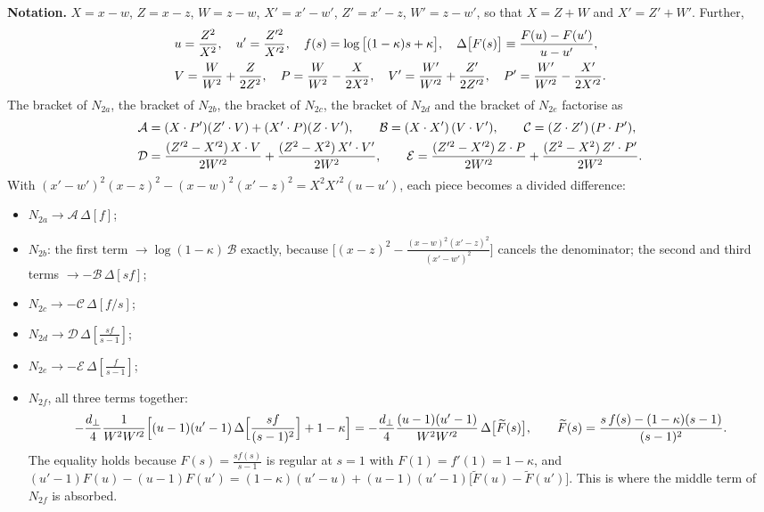 \documentclass[9pt]{article}
\numberwithin{equation}{section}
\begin{document}
{\noindent\textbf{Notation.} $X=x-w$, $Z=x-z$, $W=z-w$, $X'=x'-w'$, $Z'=x'-z$, $W'=z-w'$, so that $X=Z+W$ and $X'=Z'+W'$. Further,
\begin{align}
&u=\frac{Z^{2}}{X^{2}},\quad u'=\frac{Z'^{2}}{X'^{2}},\quad f(s)=\log\big[(1-\kappa)s+\kappa\big],\quad
\Delta\big[F(s)\big]\equiv\frac{F(u)-F(u')}{u-u'},\notag\\
&V=\frac{W}{W^{2}}+\frac{Z}{2Z^{2}},\quad P=\frac{W}{W^{2}}-\frac{X}{2X^{2}},\quad V'=\frac{W'}{W'^{2}}+\frac{Z'}{2Z'^{2}},\quad P'=\frac{W'}{W'^{2}}-\frac{X'}{2X'^{2}}.
\end{align}
The bracket of $N_{2a}$, the bracket of $N_{2b}$, the bracket of $N_{2c}$, the bracket of $N_{2d}$ and the bracket of $N_{2e}$ factorise as
\begin{align}
&\mathcal A=(X\cdot P')(Z'\cdot V)+(X'\cdot P)(Z\cdot V'),\qquad \mathcal B=(X\cdot X')\,(V\cdot V'),\qquad \mathcal C=(Z\cdot Z')\,(P\cdot P'),\notag\\
&\mathcal D=\frac{(Z'^{2}-X'^{2})\,X\cdot V}{2W'^{2}}+\frac{(Z^{2}-X^{2})\,X'\cdot V'}{2W^{2}},\qquad
\mathcal E=\frac{(Z'^{2}-X'^{2})\,Z\cdot P}{2W'^{2}}+\frac{(Z^{2}-X^{2})\,Z'\cdot P'}{2W^{2}}.
\end{align}
With $(x'-w')^{2}(x-z)^{2}-(x-w)^{2}(x'-z)^{2}=X^{2}X'^{2}(u-u')$, each piece becomes a divided difference:
\begin{itemize}
\item $N_{2a}\to\mathcal A\,\Delta[f]$;
\item $N_{2b}$: the first term $\to\log(1-\kappa)\,\mathcal B$ exactly, because $\big[(x-z)^{2}-\frac{(x-w)^{2}(x'-z)^{2}}{(x'-w')^{2}}\big]$ cancels the denominator; the second and third terms $\to-\mathcal B\,\Delta[sf]$;
\item $N_{2c}\to-\mathcal C\,\Delta[f/s]$;
\item $N_{2d}\to\mathcal D\,\Delta[\frac{sf}{s-1}]$;
\item $N_{2e}\to-\mathcal E\,\Delta[\frac{f}{s-1}]$;
\item $N_{2f}$, all three terms together:
\begin{align}
-\frac{d_{\perp}}{4}\frac{1}{W^{2}W'^{2}}\Big[(u-1)(u'-1)\,\Delta\Big[\frac{sf}{(s-1)^{2}}\Big]+1-\kappa\Big]=-\frac{d_{\perp}}{4}\frac{(u-1)(u'-1)}{W^{2}W'^{2}}\,\Delta\big[\widetilde F(s)\big],\qquad
\widetilde F(s)=\frac{s\,f(s)-(1-\kappa)(s-1)}{(s-1)^{2}}.\notag
\end{align}
The equality holds because $F(s)=\frac{sf(s)}{s-1}$ is regular at $s=1$ with $F(1)=f'(1)=1-\kappa$, and $(u'-1)F(u)-(u-1)F(u')=(1-\kappa)(u'-u)+(u-1)(u'-1)\big[\widetilde F(u)-\widetilde F(u')\big]$. This is where the middle term of $N_{2f}$ is absorbed.

\end{itemize}}
\end{document}
